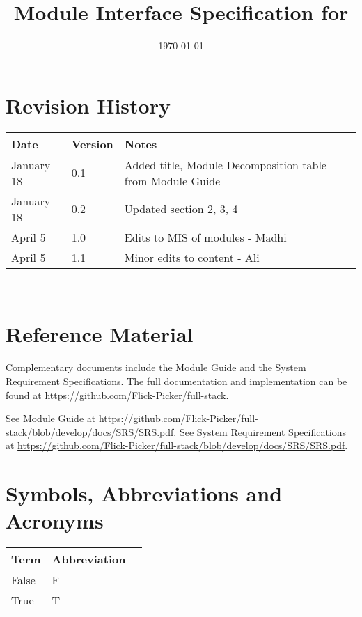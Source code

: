 \documentclass[12pt, titlepage]{article}
\begin{document}
\title{Module Interface Specification for \progname{}}

\author{\authname}

\date{\today}

\maketitle


\section{Revision History}

\begin{tabularx}{\textwidth}{p{3cm}p{2cm}X}
\toprule {\bf Date} & {\bf Version} & {\bf Notes}\\
\midrule
January 18 & 0.1 & Added title, Module Decomposition table from Module Guide\\
January 18 & 0.2 & Updated section 2, 3, 4\\
April 5 & 1.0 &  Edits to MIS of modules - Madhi \\
April 5 & 1.1 & Minor edits to content - Ali \\
\bottomrule
\end{tabularx}

~\newpage

\section{Reference Material}

Complementary documents include the Module Guide and the System Requirement Specifications.
The full documentation and implementation can be
found at \url{https://github.com/Flick-Picker/full-stack}.

See Module Guide at \url{https://github.com/Flick-Picker/full-stack/blob/develop/docs/SRS/SRS.pdf}.
See System Requirement Specifications at \url{https://github.com/Flick-Picker/full-stack/blob/develop/docs/SRS/SRS.pdf}.


\section{Symbols, Abbreviations and Acronyms}

\begin{center}
	
	\renewcommand{\arraystretch}{1.2}
	\noindent 
	\begin{tabular}{l l p{7.5cm}} 
		\toprule 
		\textbf{Term} & \textbf{Abbreviation}\\ 
		\midrule
		False & F\\
		True & T\\
		\bottomrule
	\end{tabular}
\end{center}
\end{document}
